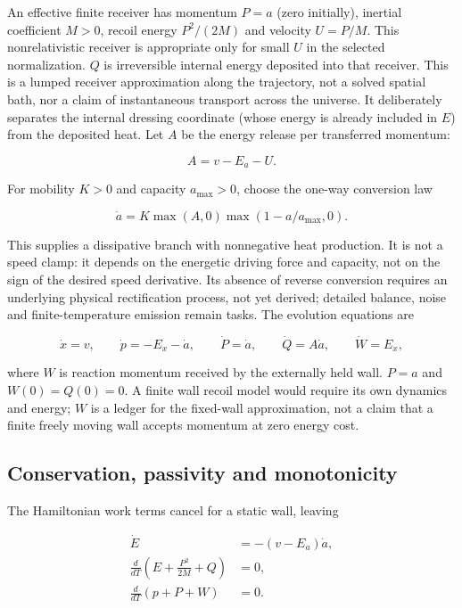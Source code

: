\documentclass[
  11pt,
  twoside]{article}
\begin{document}
An effective finite receiver has momentum \(P=a\) (zero initially),
inertial coefficient \(M>0\), recoil energy \(P^2/(2M)\) and velocity
\(U=P/M\). This nonrelativistic receiver is appropriate only for small
\(U\) in the selected normalization. \(Q\) is irreversible internal
energy deposited into that receiver. This is a lumped receiver
approximation along the trajectory, not a solved spatial bath, nor a
claim of instantaneous transport across the universe. It deliberately
separates the internal dressing coordinate (whose energy is already
included in \(E\)) from the deposited heat. Let \(A\) be the energy
release per transferred momentum:

\[A=v-E_a-U.\]

For mobility \(K>0\) and capacity \(a_{\max}>0\), choose the one-way
conversion law

\[\dot a=K\max(A,0)\max(1-a/a_{\max},0).\]

This supplies a dissipative branch with nonnegative heat production. It
is not a speed clamp: it depends on the energetic driving force and
capacity, not on the sign of the desired speed derivative. Its absence
of reverse conversion requires an underlying physical rectification
process, not yet derived; detailed balance, noise and finite-temperature
emission remain tasks. The evolution equations are

\[\dot x=v,\qquad \dot p=-E_x-\dot a,\qquad \dot P=\dot a,\qquad \dot Q=A\dot a,\qquad \dot W=E_x,\]

where \(W\) is reaction momentum received by the externally held wall.
\(P=a\) and \(W(0)=Q(0)=0\). A finite wall recoil model would require
its own dynamics and energy; \(W\) is a ledger for the fixed-wall
approximation, not a claim that a finite freely moving wall accepts
momentum at zero energy cost.

\subsection{Conservation, passivity and
monotonicity}\label{conservation-passivity-and-monotonicity}

The Hamiltonian work terms cancel for a static wall, leaving

\[\begin{aligned}\dot E&=-(v-E_a)\dot a,\\\frac{d}{dT}\left(E+\frac{P^2}{2M}+Q\right)&=0,\\\frac{d}{dT}(p+P+W)&=0.\end{aligned}\]
\end{document}
